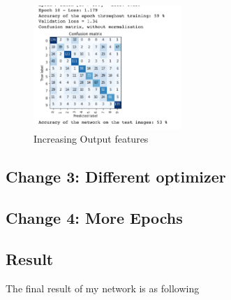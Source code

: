 \documentclass{article}
\begin{document}
    \begin{figure}[h!]
        \centering
        \includegraphics[width=0.5\textwidth]{bigger_output}
        \caption{Increasing Output features}
    \end{figure}

    \subsection{Change 3: Different optimizer}

    \subsection{Change 4: More Epochs}


    \subsection{Result}
    The final result of my network is as following

    
    
\end{document}
